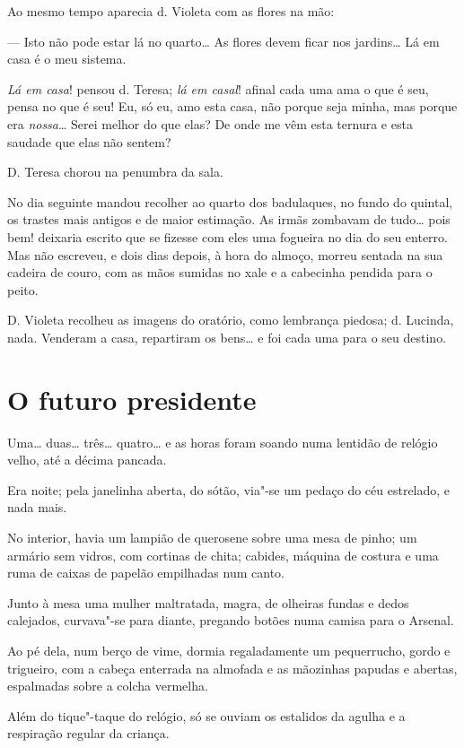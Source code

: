 Ao mesmo tempo aparecia d. Violeta com as flores na mão:

--- Isto não pode estar lá no quarto\ldots{} As flores devem ficar nos
jardins\ldots{} Lá em casa é o meu sistema.

\emph{Lá em casa}! pensou d. Teresa; \emph{lá em casal}! afinal cada uma
ama o que é seu, pensa no que é seu! Eu, só eu, amo esta casa, não
porque seja minha, mas porque era \emph{nossa}\ldots{} Serei melhor do que
elas? De onde me vêm esta ternura e esta saudade que elas não sentem?

D. Teresa chorou na penumbra da sala.

No dia seguinte mandou recolher ao quarto dos badulaques, no fundo do
quintal, os trastes mais antigos e de maior estimação. As irmãs zombavam
de tudo\ldots{} pois bem! deixaria escrito que se fizesse com eles uma
fogueira no dia do seu enterro. Mas não escreveu, e dois dias depois, à
hora do almoço, morreu sentada na sua cadeira de couro, com as mãos
sumidas no xale e a cabecinha pendida para o peito.

D. Violeta recolheu as imagens do oratório, como lembrança piedosa; d.
Lucinda, nada. Venderam a casa, repartiram os bens\ldots{} e foi cada uma
para o seu destino.

\chapter{O futuro presidente}

Uma\ldots{} duas\ldots{} três\ldots{} quatro\ldots{} e as horas foram soando numa lentidão
de relógio velho, até a décima pancada.

Era noite; pela janelinha aberta, do sótão, via"-se um pedaço do céu
estrelado, e nada mais.

No interior, havia um lampião de querosene sobre uma mesa de pinho; um
armário sem vidros, com cortinas de chita; cabides, máquina de costura e
uma ruma de caixas de papelão empilhadas num canto.

Junto à mesa uma mulher maltratada, magra, de olheiras fundas e dedos
calejados, curvava"-se para diante, pregando botões numa camisa para o
Arsenal.

Ao pé dela, num berço de vime, dormia regaladamente um pequerrucho,
gordo e trigueiro, com a cabeça enterrada na almofada e as mãozinhas
papudas e abertas, espalmadas sobre a colcha vermelha.

Além do tique"-taque do relógio, só se ouviam os estalidos da agulha e a
respiração regular da criança.

